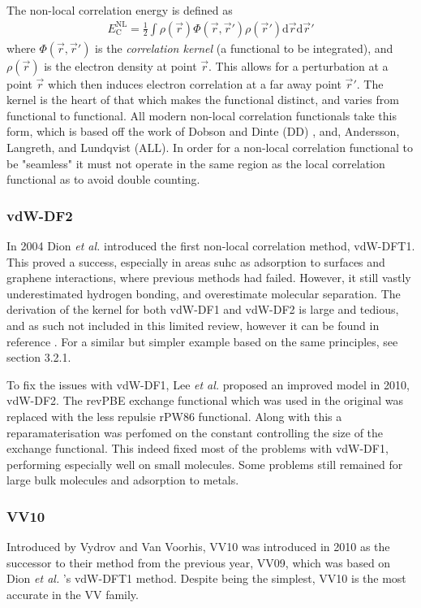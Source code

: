 \documentclass[10pt,a4paper,twocolumn,twoside]{extarticle}
\newcommand{\al}{\emph{et al. }}
\renewcommand{\d}{\text{d}}
\begin{document}
	The non-local correlation energy is defined as 
	\begin{align}
		E^\text{NL}_\text{C} = \frac{1}{2} \int  \rho(\vec{r}) \Phi(\vec{r}, \vec{r}') \rho(\vec{r}') \d\vec{r} \d\vec{r}'
	\end{align}
	where $\Phi(\vec{r}, \vec{r}')$ is the \emph{correlation kernel} (a functional to be integrated), and $\rho(\vec{r})$ is the electron density at point $\vec{r}$. This allows for a perturbation at a point $\vec{r}$ which then induces electron correlation at a far away point $\vec{r}'$. The kernel is the heart of that which makes the functional distinct, and varies from functional to functional. All modern non-local correlation functionals take this form, which is based off the work of Dobson and Dinte (DD) \cite{DD}, and, Andersson, Langreth, and Lundqvist (ALL)\cite{ALL}.
	In order for a non-local correlation functional to be "seamless" it must not operate in the same region as the local correlation functional as to avoid double counting. 

	\subsubsection{vdW-DF2}
	In 2004 Dion \al introduced the first non-local correlation method, vdW-DFT1. \cite{vdw04Original-Dion2004} This proved a success, especially in areas suhc as adsorption to surfaces and graphene interactions, where previous methods had failed. \cite{vdW-review} However, it still vastly underestimated hydrogen bonding, and overestimate molecular separation. The derivation of the kernel for both vdW-DF1 and vdW-DF2 is large and tedious, and as such not included in this limited review, however it can be found in reference \cite{vdw04Original-Dion2004}. For a similar but simpler example based on the same principles, see section 3.2.1.

	To fix the issues with vdW-DF1, Lee \al proposed an improved model in 2010, vdW-DF2. \cite{Lee2010-vdW-DF2-Original} The revPBE\cite{revPBE} exchange functional which was used in the original was replaced with the less repulsie rPW86 functional. \cite{rPW86} Along with this a reparamaterisation was perfomed on the constant controlling the size of the exchange functional. This indeed fixed most of the problems with vdW-DF1, performing especially well on small molecules. Some problems still remained for large bulk molecules and adsorption to metals. 


	\subsubsection{VV10}
	\label{sec:VV10}
	Introduced by Vydrov and Van Voorhis, VV10 was introduced in 2010 as the successor to their method from the previous year, VV09, which was based on Dion \al's vdW-DFT1 method.\cite{VV09Original-Vydrov2009}\cite{Vydrov2010} 
	Despite being the simplest, VV10 is the most accurate in the VV family.\cite{Grimme2011} 
\end{document}

